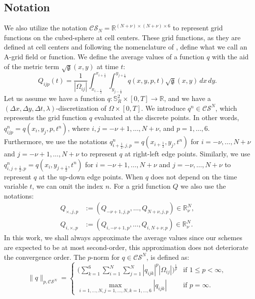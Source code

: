 \subsection{Notation}
\label{cs-notation}
We also utilize the notation $\mathcal{CS}_N=\mathbb{R}^{(N+\nu)\times(N+\nu)\times 6}$
to represent grid functions on the cubed-sphere at cell centers.
These grid functions, as they are defined at cell centers and following the nomenclature of \citet{arakawa:1977}, define what we call an A-grid field or function.
We define the average values of a function $q$ with the aid of the metric term
$\sqrt{\mathfrak{g}}(x,y)$ at time $t$: 
\begin{equation}
	\label{qav-sphere}
	Q_{ijp}(t) = \frac{1}{|\Omega_{ij}|}\int_{x_{i-\frac{1}{2}}}^{x_{i+\frac{1}{2}}}
	\int_{y_{j-\frac{1}{2}}}^{y_{j+\frac{1}{2}}}  q(x,y,p,t) {\sqrt{\mathfrak{g}}(x,y)}\,dx \,dy.
\end{equation}
Let us assume we have a function $q:\mathbb{S}^2_R\times[0,T] \to \mathbb{R}$, 
and we have a $(\Delta x, \Delta y, \Delta t, \lambda)$-discretization of $\Omega \times [0,T]$.
We introduce $q^n \in \mathcal{CS}^N$, which represents the grid function $q$
evaluated at the discrete points. 
In other words, $q^n_{ijp} = q(x_i,y_j,p,t^n)$, where $i,j=-\nu +1, \ldots, N+\nu$, and $p=1, \ldots, 6$.
Furthermore, we use the notations $q^n_{i+\frac{1}{2},j,p} = q(x_{i+\frac{1}{2}},y_j, t^n)$ 
for $i=-\nu, \ldots, N+\nu$ and $j=-\nu +1, \ldots, N+\nu$ to represent $q$ at right-left edge points.
Similarly, we use $q^n_{i,j+\frac{1}{2},p} = q(x_i,y_{j+\frac{1}{2}},t^n)$ for $i=-\nu +1, \ldots, N+\nu$ and $j=-\nu, \ldots, N+\nu$ to represent $q$ at the
up-down edge points.
When $q$ does not depend on the time variable $t$, we can omit the index $n$.
For a grid function $Q$ we also use the notations:
\begin{align*}
	Q_{\times,j,p} &:= (Q_{-\nu+1,j,p}, \ldots, Q_{N+\nu,j,p}) \in \mathbb{R}^{N}_{\nu},\\
	Q_{i,\times,p} &:= (Q_{i,-\nu+1,p}, \ldots, Q_{i,N+\nu,p}) \in \mathbb{R}^{N}_{\nu}.
\end{align*}
In this work, we shall always approximate the average values since our schemes are expected to be at most second-order,
this approximation does not deteriorate the convergence order.
The $p$-norm for $q \in \mathcal{CS}^N$, is defined as:
\begin{equation}
	\label{chp-advcs-pnorm}
	\|q\|_{p, \mathcal{CS}^N}=
	\begin{cases}
		\bigg( \sum_{k=1}^{6} \sum_{i=1}^{N} \sum_{j=1}^{N}|q_{ijk}|^p |\Omega_{ij}|\bigg)^{\frac{1}{p}} & \text{if } 1\leq p < \infty,\\
		\max_{i=1, \ldots, N,j=1,\ldots,N,k=1,\ldots,6}{|q_{ijk}|} & \text{if } p=\infty.
	\end{cases}
\end{equation}

